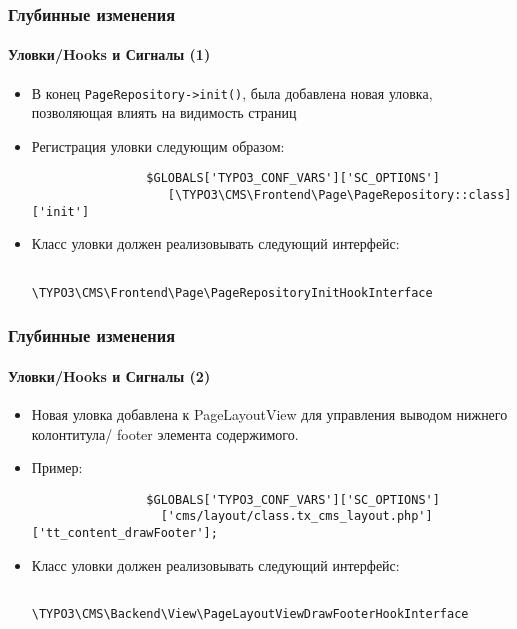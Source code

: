 \begin{frame}[fragile]
	\frametitle{Глубинные изменения}
	\framesubtitle{Уловки/Hooks и Сигналы (1)}

	\begin{itemize}

		\item В конец \texttt{PageRepository->init()}, была добавлена новая уловка,
			позволяющая влиять на видимость страниц

		\item Регистрация уловки следующим образом:
			\begin{lstlisting}
				$GLOBALS['TYPO3_CONF_VARS']['SC_OPTIONS']
				   [\TYPO3\CMS\Frontend\Page\PageRepository::class]['init']
			\end{lstlisting}

		\item Класс уловки должен реализовывать следующий интерфейс:
			\begin{lstlisting}
				\TYPO3\CMS\Frontend\Page\PageRepositoryInitHookInterface
			\end{lstlisting}

	\end{itemize}

\end{frame}


\begin{frame}[fragile]
	\frametitle{Глубинные изменения}
	\framesubtitle{Уловки/Hooks и Сигналы (2)}

	\begin{itemize}

		\item Новая уловка добавлена к PageLayoutView для управления выводом нижнего колонтитула/
			footer элемента содержимого.

		\item Пример:
			\begin{lstlisting}
				$GLOBALS['TYPO3_CONF_VARS']['SC_OPTIONS']
				  ['cms/layout/class.tx_cms_layout.php']['tt_content_drawFooter'];
			\end{lstlisting}

		\item Класс уловки должен реализовывать следующий интерфейс:
			\begin{lstlisting}
				\TYPO3\CMS\Backend\View\PageLayoutViewDrawFooterHookInterface
			\end{lstlisting}

	\end{itemize}

\end{frame}

